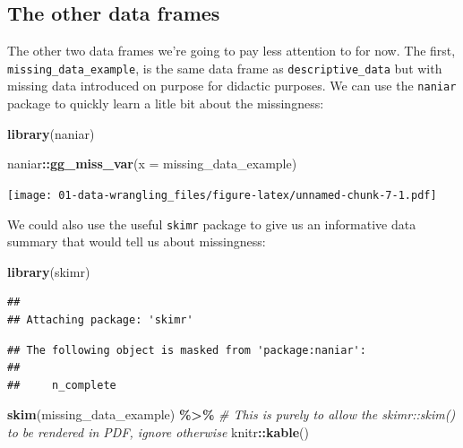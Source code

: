 \documentclass[
]{book}
\newenvironment{Shaded}{\begin{snugshade}}{\end{snugshade}}
\newcommand{\AttributeTok}[1]{\textcolor[rgb]{0.13,0.29,0.53}{#1}}
\newcommand{\CommentTok}[1]{\textcolor[rgb]{0.56,0.35,0.01}{\textit{#1}}}
\newcommand{\FunctionTok}[1]{\textcolor[rgb]{0.13,0.29,0.53}{\textbf{#1}}}
\newcommand{\NormalTok}[1]{#1}
\newcommand{\SpecialCharTok}[1]{\textcolor[rgb]{0.81,0.36,0.00}{\textbf{#1}}}
\begin{document}
\subsection{The other data frames}\label{the-other-data-frames}

The other two data frames we're going to pay less attention to for now. The first, \texttt{missing\_data\_example}, is the same data frame as \texttt{descriptive\_data} but with missing data introduced on purpose for didactic purposes. We can use the \texttt{naniar} package to quickly learn a litle bit about the missingness:

\begin{Shaded}
\begin{Highlighting}[]
\FunctionTok{library}\NormalTok{(naniar)}

\NormalTok{naniar}\SpecialCharTok{::}\FunctionTok{gg\_miss\_var}\NormalTok{(}\AttributeTok{x =}\NormalTok{ missing\_data\_example)}
\end{Highlighting}
\end{Shaded}

\texttt{[image: 01-data-wrangling\_files/figure-latex/unnamed-chunk-7-1.pdf]}

We could also use the useful \texttt{skimr} package to give us an informative data summary that would tell us about missingness:

\begin{Shaded}
\begin{Highlighting}[]
\FunctionTok{library}\NormalTok{(skimr)}
\end{Highlighting}
\end{Shaded}

\begin{verbatim}
## 
## Attaching package: 'skimr'
\end{verbatim}

\begin{verbatim}
## The following object is masked from 'package:naniar':
## 
##     n_complete
\end{verbatim}

\begin{Shaded}
\begin{Highlighting}[]
\FunctionTok{skim}\NormalTok{(missing\_data\_example) }\SpecialCharTok{\%\textgreater{}\%} 
  \CommentTok{\# This is purely to allow the skimr::skim() to be rendered in PDF, ignore otherwise}
\NormalTok{  knitr}\SpecialCharTok{::}\FunctionTok{kable}\NormalTok{()}
\end{Highlighting}
\end{Shaded}
\end{document}
